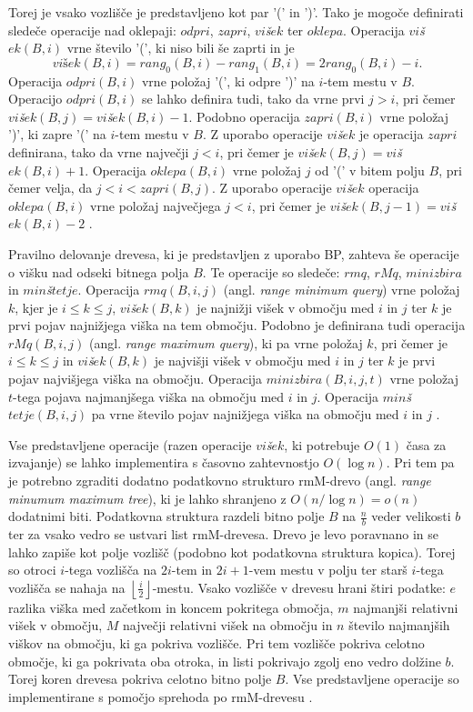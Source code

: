 Torej je vsako vozlišče je predstavljeno kot par '(' in ')'. Tako je mogoče definirati sledeče operacije nad oklepaji: $odpri$, $zapri$, $vi$\textit{š}$ek$ ter $oklepa$. Operacija $vi$\textit{š}$ek(B,i)$ vrne število '(', ki niso bili še zaprti in je
$$
    \textit{višek}(B,i)=rang_0(B,i)-rang_1(B,i)=2rang_0(B,i)-i.
$$
Operacija $odpri(B,i)$ vrne položaj '(', ki odpre ')' na $i$-tem mestu v $B$. Operacijo $odpri(B,i)$ se lahko definira tudi, tako da vrne prvi $j>i$, pri čemer $vi$\textit{š}$ek(B,j)=vi$\textit{š}$ek(B,i)-1$. Podobno operacija $zapri(B,i)$  vrne položaj ')', ki zapre '(' na $i$-tem mestu v $B$. Z uporabo operacije $vi$\textit{š}$ek$ je operacija $zapri$ definirana, tako da vrne največji $j<i$, pri čemer je $vi$\textit{š}$ek(B,j)=vi$\textit{š}$ek(B,i)+1$. Operacija $oklepa(B,i)$ vrne položaj $j$ od '(' v bitem polju $B$, pri čemer velja, da $j<i<zapri(B,j)$. Z uporabo operacije $vi$\textit{š}$ek$ operacija $oklepa(B,i)$ vrne položaj največjega $j<i$, pri čemer je $vi$\textit{š}$ek(B,j-1)=vi$\textit{š}$ek(B,i)-2$
 \cite{Navarro2016}.

Pravilno delovanje drevesa, ki je predstavljen z uporabo BP, zahteva še operacije o višku nad odseki bitnega polja $B$. Te operacije so sledeče: $rmq$, $rMq$, $minizbira$ in $min$\textit{š}$tetje$. Operacija $rmq(B,i,j)$ (angl. \textit{range minimum query}) vrne položaj $k$, kjer je $i\le k\le j$, $vi$\textit{š}$ek(B,k)$ je najnižji višek v območju med $i$ in $j$ ter $k$ je prvi pojav najnižjega viška na tem območju. Podobno je definirana tudi operacija $rMq(B,i,j)$ (angl. \textit{range maximum query}), ki pa vrne položaj $k$, pri čemer je $i\le k\le j$ in $vi$\textit{š}$ek(B,k)$ je najvišji višek v območju med $i$ in $j$ ter $k$ je prvi pojav najvišjega viška na območju. Operacija $minizbira(B,i,j,t)$ vrne položaj $t$-tega pojava najmanjšega viška na območju med $i$ in $j$. Operacija $min$\textit{š}$tetje(B,i,j)$ pa vrne število pojav najnižjega viška na območju med $i$ in $j$ \cite{Navarro2016}.

Vse predstavljene operacije (razen operacije $vi$\textit{š}$ek$, ki potrebuje $O(1)$ časa za izvajanje) se lahko implementira s časovno zahtevnostjo $O(\log{n})$. Pri tem pa je potrebno zgraditi dodatno podatkovno strukturo rmM-drevo (angl. \textit{range minumum maximum tree}), ki je lahko shranjeno z $O(n/\log{n})=o(n)$ dodatnimi biti. Podatkovna struktura razdeli bitno polje $B$ na $\frac{n}{b}$ veder velikosti $b$ ter za vsako vedro se ustvari list rmM-drevesa. Drevo je levo poravnano in se lahko zapiše kot polje vozlišč (podobno kot podatkovna struktura kopica). Torej so otroci $i$-tega vozlišča na $2i$-tem in $2i+1$-vem mestu v polju ter starš $i$-tega vozlišča se nahaja na $\left\lfloor\frac{i}{2}\right\rfloor$-mestu. Vsako vozlišče v drevesu hrani štiri podatke: $e$ razlika viška med začetkom in koncem pokritega območja, $m$ najmanjši relativni višek v območju, $M$ največji relativni višek na območju in $n$ število najmanjših viškov na območju, ki ga pokriva vozlišče. Pri tem vozlišče pokriva celotno območje, ki ga pokrivata oba otroka, in listi pokrivajo zgolj eno vedro dolžine $b$. Torej koren drevesa pokriva celotno bitno polje $B$. Vse predstavljene operacije so implementirane s pomočjo sprehoda po rmM-drevesu 
\cite{Navarro2016}.

